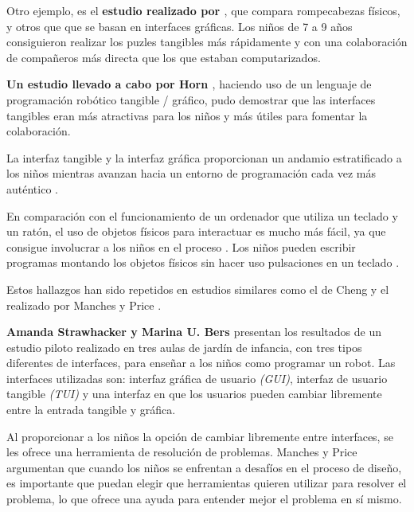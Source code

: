 Otro ejemplo, es el \textbf{estudio realizado por \cite{Xie}}, que compara rompecabezas físicos, y otros que que se basan en interfaces gráficas. Los niños de 7 a 9 años consiguieron realizar los puzles tangibles más rápidamente y con una colaboración de compañeros más directa que los que estaban computarizados. 

\textbf{Un estudio llevado a cabo por Horn \cite{Horn}}, haciendo uso de un lenguaje de programación robótico tangible / gráfico, pudo demostrar que las interfaces tangibles eran más atractivas para los niños y más útiles para fomentar la colaboración. 
 
La interfaz tangible y la interfaz gráfica proporcionan un andamio estratificado a los niños mientras avanzan hacia un entorno de programación cada vez más auténtico \cite{Horn}. 

En comparación con el funcionamiento de un ordenador que utiliza un teclado y un ratón, el uso de objetos físicos para interactuar es mucho más fácil, ya que consigue involucrar a los niños en el proceso \cite{McNerney}. Los niños pueden escribir programas montando los objetos físicos sin hacer uso pulsaciones en un teclado \cite{Horn}\cite{McNerney}.

Estos hallazgos han sido repetidos en estudios similares como el de Cheng \cite{Cheng} y el realizado por Manches y Price \cite{Manches}. 

\textbf{Amanda Strawhacker y Marina U. Bers \cite{Strawhacker}} presentan los resultados de un estudio piloto realizado en tres aulas de jardín de infancia, con tres tipos diferentes de interfaces, para enseñar a los niños como programar un robot. Las interfaces utilizadas son: interfaz gráfica de usuario \emph{(GUI)}, interfaz de usuario tangible \emph{(TUI)} y una interfaz en que los usuarios pueden cambiar libremente entre la entrada tangible y gráfica. 

Al proporcionar a los niños la opción de cambiar libremente entre interfaces, se les ofrece una herramienta de resolución de problemas. Manches y Price \cite{Manches} argumentan que cuando los niños se enfrentan a desafíos en el proceso de diseño, es importante que puedan elegir que herramientas quieren utilizar para resolver el problema, lo que ofrece una ayuda para entender mejor el problema en sí mismo.

